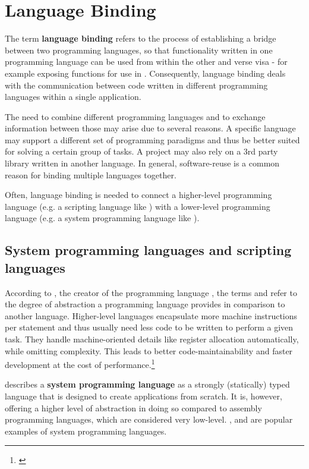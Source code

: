 \chapter{Language Binding}
\label{chap:LanguageBinding}

The term \textbf{language binding} refers to the process of establishing a bridge between two programming languages, so that functionality written in one programming language can be used from within the other and verse visa - for example exposing  functions for use in . Consequently, language binding deals with the communication between code written in different programming languages within a single application.

The need to combine different programming languages and to exchange information between those may arise due to several reasons. A specific language may support a different set of programming paradigms and thus be better suited for solving a certain group of tasks. A project may also rely on a 3rd party library written in another language. In general, software-reuse is a common reason for binding multiple languages together.

Often, language binding is needed to connect a higher-level programming language (e.g. a scripting language like ) with a lower-level programming language (e.g. a system programming language like ).

\section{System programming languages and scripting languages}

According to , the creator of the programming language , the terms \textbf{} and \textbf{} refer to the degree of abstraction a programming language provides in comparison to another language. Higher-level languages encapsulate more machine instructions per statement and thus usually need less code to be written to perform a given task. They handle machine-oriented details like register allocation automatically, while omitting complexity. This leads to better code-maintainability and faster development at the cost of performance.\footnote{\citep{Ousterhout}}

 describes a \textbf{system programming language} as a strongly (statically) typed language that is designed to create applications from scratch. It is, however, offering a higher level of abstraction in doing so compared to assembly programming languages, which are considered very low-level. ,  and  are popular examples of system programming languages.


